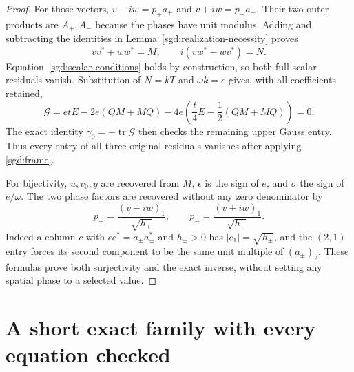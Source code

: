 \documentclass[11pt]{article}
\newcommand{\tr}{\operatorname{tr}}
\begin{document}
\begin{proof}
For those vectors, $v-iw=p_+a_+$ and $v+iw=p_-a_-$.
Their two outer products are $A_+,A_-$ because the phases have unit
modulus. Adding and subtracting the identities in
Lemma~\ref{sgd:realization-necessity} proves
\[
 vv^*+ww^*=M,\qquad i(vw^*-wv^*)=N.
\]
Equation~\eqref{sgd:scalar-conditions} holds by construction, so both
full scalar residuals vanish. Substitution of $N=kT$ and
$\omega k=e$ gives, with all coefficients retained,
\[
 \mathcal G=etE-2e(QM+MQ)
        -4e\left(\frac t4E-\frac12(QM+MQ)\right)=0.
\]
The exact identity $\gamma_0=-\tr\mathcal G$ then checks the
remaining upper Gauss entry. Thus every entry of all three original
residuals vanishes after applying \eqref{sgd:frame}.

For bijectivity, $u,v_0,y$ are recovered from $M$, $\epsilon$ is
the sign of $e$, and $\sigma$ the sign of $e/\omega$. The two
phase factors are recovered without any zero denominator by
\[
 p_+=\frac{(v-iw)_1}{\sqrt{h_+}},\qquad
 p_-=\frac{(v+iw)_1}{\sqrt{h_-}}.
\]
Indeed a column $c$ with $cc^*=a_\pm a_\pm^*$ and $h_\pm>0$
has $|c_1|=\sqrt{h_\pm}$, and the $(2,1)$ entry forces its second
component to be the same unit multiple of $(a_\pm)_2$.
These formulas prove both surjectivity and the exact inverse, without
setting any spatial phase to a selected value.
\end{proof}

\section{A short exact family with every equation checked}
\end{document}
